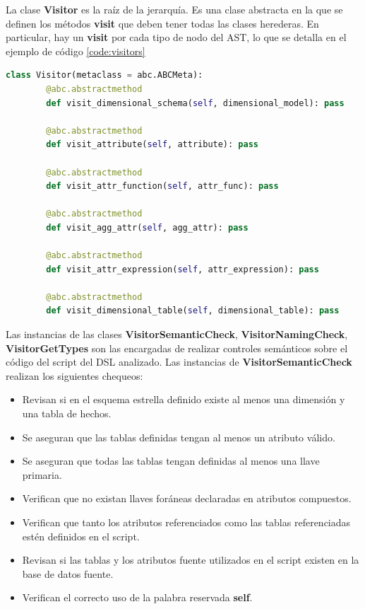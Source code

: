 La clase \textbf{Visitor} es la raíz de la jerarquía. Es una clase abstracta en la que se definen los métodos 
\textbf{visit} que deben tener todas las clases herederas. En particular, hay un \textbf{visit} por cada tipo de 
nodo del AST, lo que se detalla en el ejemplo de c\'odigo \ref{code:visitors}

\begin{lstlisting}[label={code:visitors}, caption={Clase Visitor}, language={python}]
    class Visitor(metaclass = abc.ABCMeta):
        @abc.abstractmethod
        def visit_dimensional_schema(self, dimensional_model): pass 

        @abc.abstractmethod
        def visit_attribute(self, attribute): pass

        @abc.abstractmethod
        def visit_attr_function(self, attr_func): pass

        @abc.abstractmethod
        def visit_agg_attr(self, agg_attr): pass

        @abc.abstractmethod
        def visit_attr_expression(self, attr_expression): pass

        @abc.abstractmethod
        def visit_dimensional_table(self, dimensional_table): pass
\end{lstlisting}

Las instancias de las clases \textbf{VisitorSemanticCheck}, \textbf{VisitorNamingCheck}, \textbf{VisitorGetTypes} 
son las encargadas de realizar
controles semánticos sobre el código del script del DSL analizado. Las instancias de \textbf{VisitorSemanticCheck} realizan los siguientes 
chequeos:

\begin{itemize}
    \item Revisan si en el esquema estrella definido existe al menos una dimensión y una tabla de hechos.
    \item Se aseguran que las tablas definidas tengan al menos un atributo válido.
    \item Se aseguran que todas las tablas tengan definidas al menos una llave primaria.
    \item Verifican que no existan llaves for\'aneas declaradas en atributos compuestos.
    \item Verifican que tanto los atributos referenciados como las tablas referenciadas est\'en definidos en el 
        script.
    \item Revisan si las tablas y los atributos fuente utilizados en el script existen en la base de datos fuente.
    \item Verifican el correcto uso de la palabra reservada \textbf{self}.
\end{itemize}

